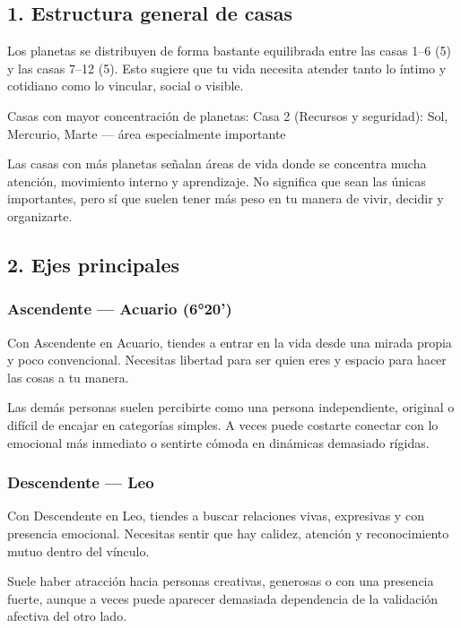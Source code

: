 \documentclass[11pt,a4paper]{article}
\begin{document}
\subsection{1. Estructura general de casas}

Los planetas se distribuyen de forma bastante equilibrada entre las casas 1–6 (5) y las casas 7–12 (5). Esto sugiere que tu vida necesita atender tanto lo íntimo y cotidiano como lo vincular, social o visible.

Casas con mayor concentración de planetas:
Casa 2 (Recursos y seguridad): Sol, Mercurio, Marte — área especialmente importante

Las casas con más planetas señalan áreas de vida donde se concentra mucha atención, movimiento interno y aprendizaje. No significa que sean las únicas importantes, pero sí que suelen tener más peso en tu manera de vivir, decidir y organizarte.

\vspace{0.5cm}

\subsection{2. Ejes principales}

\subsubsection*{Ascendente — Acuario (6°20')}
Con Ascendente en Acuario, tiendes a entrar en la vida desde una mirada propia y poco convencional. Necesitas libertad para ser quien eres y espacio para hacer las cosas a tu manera.

Las demás personas suelen percibirte como una persona independiente, original o difícil de encajar en categorías simples. A veces puede costarte conectar con lo emocional más inmediato o sentirte cómoda en dinámicas demasiado rígidas.

\subsubsection*{Descendente — Leo}
Con Descendente en Leo, tiendes a buscar relaciones vivas, expresivas y con presencia emocional. Necesitas sentir que hay calidez, atención y reconocimiento mutuo dentro del vínculo.

Suele haber atracción hacia personas creativas, generosas o con una presencia fuerte, aunque a veces puede aparecer demasiada dependencia de la validación afectiva del otro lado.
\end{document}
